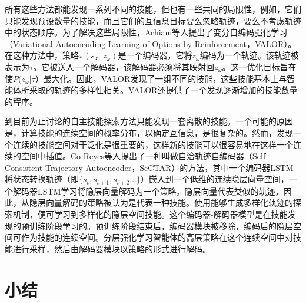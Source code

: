 所有这些方法都能发现一系列不同的技能，但也有一些共同的局限性，例如，它们只能发现预设数量的技能，而且它们的互信息目标要么忽略轨迹，要么不考虑轨迹中的状态顺序。为了解决这些局限性，Achiam等人\cite{achiam2018variational}提出了变分自编码强化学习（Variational Autoencoding Learning of Options by Reinforcement，VALOR）。在这种方法中，策略$\pi(s，z_\omega)$是一个编码器，它将$z_\omega$编码为一个轨迹。该轨迹被表示为$\tau$。它被送入一个解码器，该解码器必须将其映射回$z_\omega$。这一优化目标旨在使$P(z_\omega |\tau）$最大化。因此，VALOR发现了一组不同的技能，这些技能基本上与智能体所采取的轨迹的多样性相关。VALOR还提供了一个发现逐渐增加的技能数量的程序。

到目前为止讨论的自主技能探索方法只能发现一套离散的技能。一个可能的原因是，计算技能的连续空间的概率分布，以确定互信息，是很复杂的。然而，发现一个连续的技能空间对于泛化是很重要的，这样新的技能可以很容易地在这样一个连续的空间中插值。Co-Reyes等人\cite{co2018self}提出了一种叫做自洽轨迹自编码器（Self Consistent Trajectory Autoencoder，SeCTAR）的方法，其中一个编码器LSTM\cite{hochreiter1997long}将状态转换轨迹（即$\{s_t , s_{t+1}, s_{t+2} ...\}$）嵌入到一个低维的连续隐层向量空间，一个解码器LSTM学习将隐层向量解码为一个策略。隐层向量代表类似的轨迹，因此，从隐层向量解码的策略被认为是代表一种技能。使用能够生成多样化轨迹的探索机制，便可学习到多样化的隐层空间技能。这个编码器-解码器模型是在技能发现的预训练阶段学习的。预训练阶段结束后，编码器模块被移除，编码后的隐层空间可作为技能的连续空间。分层强化学习智能体的高层策略在这个连续空间中对技能进行采样，然后由解码器模块以策略的形式进行解码。

\section{小结}

